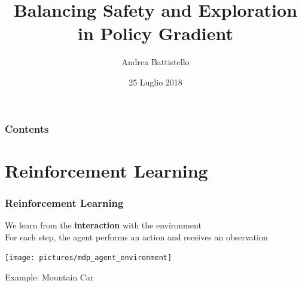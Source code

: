\documentclass{beamer}
\title[Balancing Safety and Exploration]{Balancing Safety and Exploration in Policy Gradient}
\author[Andrea Battistello]{Andrea Battistello}
\institute[PoliMI]{Politecnico di Milano}
\date[25/07/2018]{25 Luglio 2018}
\begin{document}
\frame{\titlepage}





\begin{frame}
\frametitle{Contents}
\tableofcontents
\end{frame}


\section{Reinforcement Learning}

\begin{frame}
\frametitle{Reinforcement Learning}

We learn from the \textbf{interaction} with the environment \\
For each step, the agent performs an action and receives an observation

\vfill

\centering
\texttt{[image: pictures/mdp\_agent\_environment]}

\end{frame}


\begin{frame}{Example: Mountain Car}
\centering 

\end{frame}


\end{document}

